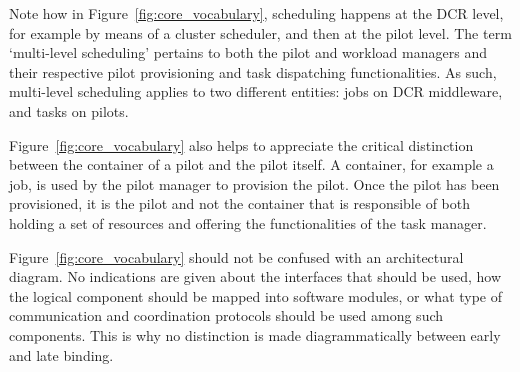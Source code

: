 \documentclass{sig-alternate}
\begin{document}

Note how in Figure~\ref{fig:core_vocabulary}, scheduling happens at the DCR
level, for example by means of a cluster scheduler, and then at the pilot level.
The term `multi-level scheduling' pertains to both the pilot and workload
managers and their respective pilot provisioning and task dispatching
functionalities.  As such, multi-level scheduling applies to two
different entities: jobs on DCR middleware, and tasks on pilots.


Figure~\ref{fig:core_vocabulary} also helps to appreciate the critical
distinction between the container of a pilot and the pilot itself. A container,
for example a job, is used by the pilot manager to provision the pilot. Once the
pilot has been provisioned, it is the pilot and not the container that is
responsible of both holding a set of resources and offering the functionalities
of the task manager.


Figure~\ref{fig:core_vocabulary} should not be confused with an architectural
diagram. No indications are given about the interfaces that should be used, how
the logical component should be mapped into software modules, or what type of
communication and coordination protocols should be used among such components.
This is why no distinction is made diagrammatically between early and late
binding.

\end{document}
